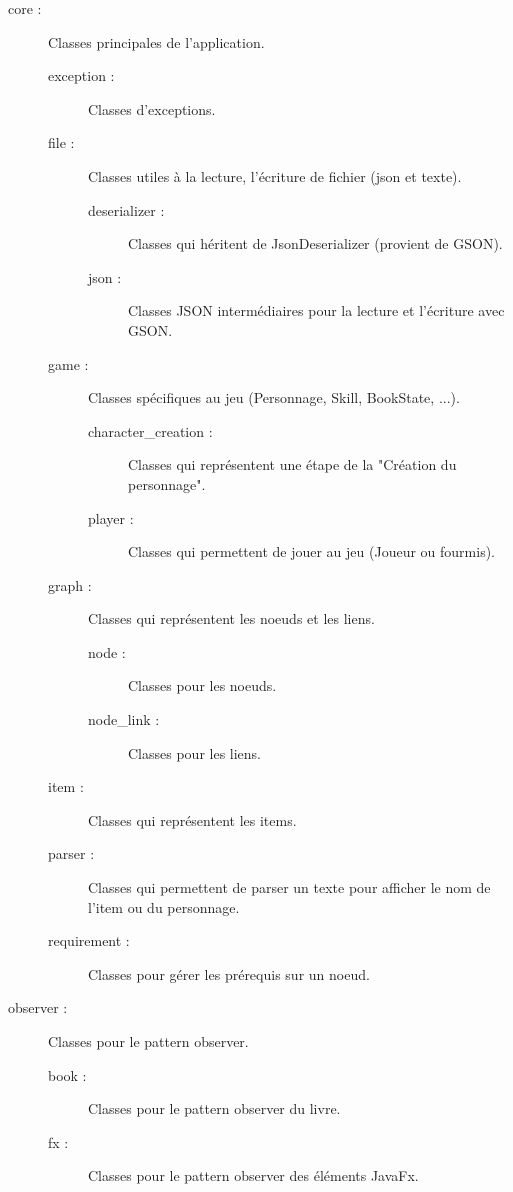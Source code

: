 		\begin{description}
			\item[core :]{Classes principales de l'application.}
			\begin{description}
				\item[exception :]{Classes d'exceptions.}
				\item[file :]{Classes utiles à la lecture, l'écriture de fichier (json et texte).}
				\begin{description}
					\item[deserializer :]{Classes qui héritent de JsonDeserializer (provient de GSON).}
					\item[json :]{Classes JSON intermédiaires pour la lecture et l'écriture avec GSON.}
				\end{description}
				\item[game :]{Classes spécifiques au jeu (Personnage, Skill, BookState, ...).}
				\begin{description}
					\item[character\_creation :]{Classes qui représentent une étape de la "Création du personnage".}
					\item[player :]{Classes qui permettent de jouer au jeu (Joueur ou fourmis).}
				\end{description}
				\item[graph :]{Classes qui représentent les noeuds et les liens.}
				\begin{description}
					\item[node :]{Classes pour les noeuds.}
					\item[node\_link :]{Classes pour les liens.}
				\end{description}
				\item[item :]{Classes qui représentent les items.}
				\item[parser :]{Classes qui permettent de parser un texte pour afficher le nom de l'item ou du personnage.}
				\item[requirement :]{Classes pour gérer les prérequis sur un noeud.}
			\end{description}

			\item[observer :]{Classes pour le pattern observer.}
			\begin{description}
				\item[book :]{Classes pour le pattern observer du livre.}
				\item[fx :]{Classes pour le pattern observer des éléments JavaFx.}
			\end{description}


\end{description}
